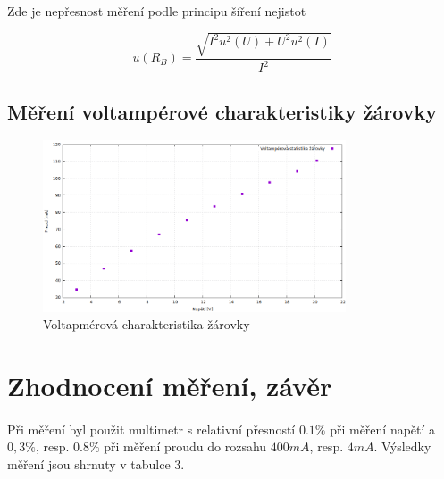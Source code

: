 \documentclass[a4paper,11pt]{article}
\begin{document}
        \paragraph{} Zde je nepřesnost měření podle principu šíření nejistot

        \begin{equation}
            u(R_{B}) = \frac{\sqrt{I^{2} u^{2}(U) + U^{2} u^{2}(I)}}{I^{2}}
        \end{equation}

    \subsection{Měření voltampérové charakteristiky žárovky}

        \begin{figure}[h]
            \centering
            \includegraphics[width=0.8\textwidth]{zarovka1.png}
            \caption{Voltapmérová charakteristika žárovky}
            \label{fig:zarovka}
        \end{figure}

        \paragraph{}

    \section{Zhodnocení měření, závěr}

    \paragraph{} Při měření byl použit multimetr s relativní přesností $0.1\%$ při měření napětí
        a $0,3\%$, resp. $0.8\%$ při měření proudu do rozsahu $400 mA$, resp. $4 mA$. Výsledky 
        měření jsou shrnuty v tabulce 3.
\end{document}
